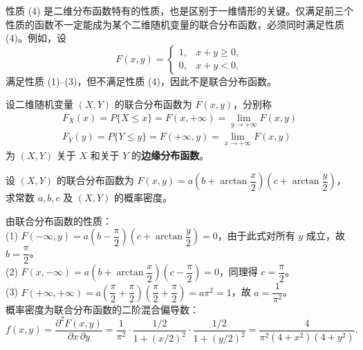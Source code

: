\documentclass[lang=cn,11pt]{elegantbook}
\begin{document}
\begin{remark}
性质 (4) 是二维分布函数特有的性质，也是区别于一维情形的关键。仅满足前三个性质的函数不一定能成为某个二维随机变量的联合分布函数，必须同时满足性质 (4)。例如，设
\[
F(x,y) = \begin{cases} 1, & x+y \geqslant 0, \\ 0, & x+y < 0, \end{cases}
\]
满足性质 (1)--(3)，但不满足性质 (4)，因此不是联合分布函数。
\end{remark}

\begin{definition}[边缘分布函数] \label{def:marginal-df}
设二维随机变量 $(X,Y)$ 的联合分布函数为 $F(x,y)$，分别称
\begin{align*}
F_X(x) = P\{X \leqslant x\} = F(x, +\infty) = \lim_{y \to +\infty} F(x,y)\\
 F_Y(y) = P\{Y \leqslant y\} = F(+\infty, y) = \lim_{x \to +\infty} F(x,y)
\end{align*}
为 $(X,Y)$ 关于 $X$ 和关于 $Y$ 的\textbf{边缘分布函数}。
\end{definition}


\begin{exercise}\label{exer:3-1}
设 $(X,Y)$ 的联合分布函数为 $F(x,y) = a\left(b + \arctan\dfrac{x}{2}\right)\left(c + \arctan\dfrac{y}{2}\right)$，求常数 $a, b, c$ 及 $(X,Y)$ 的概率密度。
\end{exercise}
\begin{solution}
由联合分布函数的性质：\\
(1) $F(-\infty, y) = a\left(b - \dfrac{\pi}{2}\right)\left(c + \arctan\dfrac{y}{2}\right) = 0$，由于此式对所有 $y$ 成立，故 $b = \dfrac{\pi}{2}$。\\
(2) $F(x, -\infty) = a\left(b + \arctan\dfrac{x}{2}\right)\left(c - \dfrac{\pi}{2}\right) = 0$，同理得 $c = \dfrac{\pi}{2}$。\\
(3) $F(+\infty, +\infty) = a\left(\dfrac{\pi}{2} + \dfrac{\pi}{2}\right)\left(\dfrac{\pi}{2} + \dfrac{\pi}{2}\right) = a\pi^2 = 1$，故 $a = \dfrac{1}{\pi^2}$。\\
概率密度为联合分布函数的二阶混合偏导数：
\[
f(x,y) = \frac{\partial^2 F(x,y)}{\partial x\,\partial y} = \frac{1}{\pi^2} \cdot \frac{1/2}{1 + (x/2)^2} \cdot \frac{1/2}{1 + (y/2)^2} = \frac{4}{\pi^2(4+x^2)(4+y^2)}.
\]
\end{solution}
\end{document}
